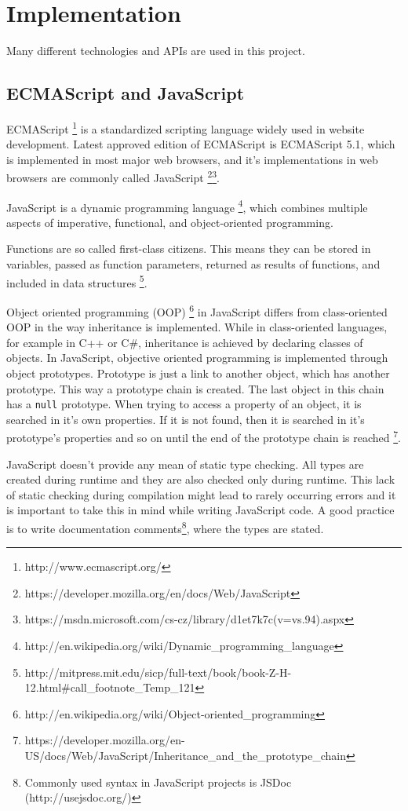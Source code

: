 \chapter{Implementation}

Many different technologies and APIs are used in this project. 



\section{ECMAScript and JavaScript}
ECMAScript \footnote{http://www.ecmascript.org/} is a standardized scripting language widely used in website development. Latest approved edition of ECMAScript is ECMAScript 5.1, which is implemented in most major web browsers, and it's implementations in web browsers are commonly called JavaScript \footnote{https://developer.mozilla.org/en/docs/Web/JavaScript}\footnote{https://msdn.microsoft.com/cs-cz/library/d1et7k7c(v=vs.94).aspx}. 

JavaScript is a dynamic programming language \footnote{http://en.wikipedia.org/wiki/Dynamic\_programming\_language}, which combines multiple aspects of imperative, functional, and object-oriented programming.

Functions are so called first-class citizens. This means they can be stored in variables, passed as function parameters, returned as results of functions, and included in data structures \cite{}\footnote{http://mitpress.mit.edu/sicp/full-text/book/book-Z-H-12.html\#call\_footnote\_Temp\_121}.

Object oriented programming (OOP) \footnote{http://en.wikipedia.org/wiki/Object-oriented\_programming} in JavaScript differs from class-oriented OOP in the way inheritance is implemented. While in class-oriented languages, for example in C++ or C\#, inheritance is achieved by declaring classes of objects. In JavaScript, objective oriented programming is implemented through object prototypes. Prototype is just a link to another object, which has another prototype. This way a prototype chain is created. The last object in this chain has a \verb|null| prototype. When trying to access a property of an object, it is searched in it's own properties. If it is not found, then it is searched in it's prototype's properties and so on until the end of the prototype chain is reached \cite{}\footnote{https://developer.mozilla.org/en-US/docs/Web/JavaScript/Inheritance\_and\_the\_prototype\_chain}.

JavaScript doesn't provide any mean of static type checking. All types are created during runtime and they are also checked only during runtime. This lack of static checking during compilation might lead to rarely occurring errors and it is important to take this in mind while writing JavaScript code. A good practice is to write documentation comments\footnote{Commonly used syntax in JavaScript projects is JSDoc (http://usejsdoc.org/)}, where the types are stated.


